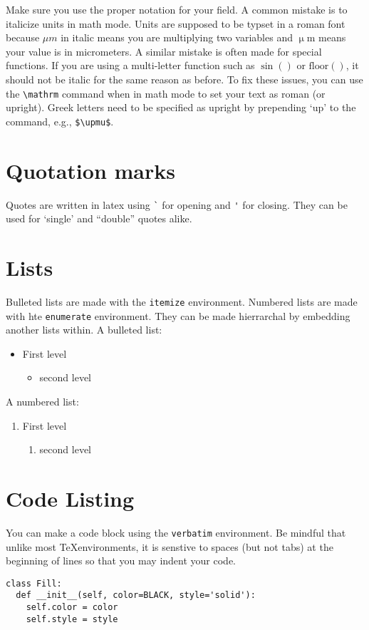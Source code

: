 Make sure you use the proper notation for your field. A common mistake is to italicize units in math mode. Units are supposed to be typset in a roman font because $\mu m$ in italic means you are multiplying two variables and $\mathrm{\upmu m}$ means your value is in micrometers. A similar mistake is often made for special functions. If you are using a multi-letter function such as $\sin()$ or $\mathrm{floor}()$, it should not be italic for the same reason as before. To fix these issues, you can use the \texttt{\textbackslash mathrm} command when in math mode to set your text as roman (or upright). Greek letters need to be specified as upright by prepending `up' to the command, e.g., \texttt{\$\textbackslash upmu\$}.

\section*{Quotation marks}
Quotes are written in latex using \texttt{\`} for opening and \texttt{\'} for closing. They can be used for `single' and ``double'' quotes alike.

\section*{Lists}
Bulleted lists are made with the \texttt{itemize} environment. Numbered lists are made with hte \texttt{enumerate} environment. They can be made hierrarchal by embedding another lists within. A bulleted list:
\begin{itemize}
	\item First level
	\begin{itemize}
		\item second level
	\end{itemize}
\end{itemize}
A numbered list:
\begin{enumerate}
	\item First level
	\begin{enumerate}
		\item second level
	\end{enumerate}
\end{enumerate}

\section*{Code Listing}
You can make a code block using the \texttt{verbatim} environment. Be mindful that unlike most \TeX environments, it is senstive to spaces (but not tabs) at the beginning of lines so that you may indent your code.
\begin{verbatim}
class Fill:
  def __init__(self, color=BLACK, style='solid'):
    self.color = color
    self.style = style
\end{verbatim}

